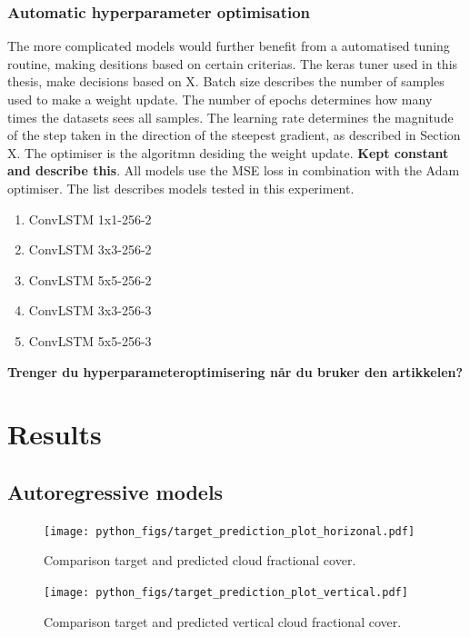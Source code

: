 \subsubsection{Automatic hyperparameter optimisation}  \label{sec:hyperparam_tuning}
The more complicated models would further benefit from a automatised tuning routine, making desitions based on certain criterias.
The keras tuner used in this thesis, make decisions based on X. Batch size describes the number of samples used to make a weight update. The number of epochs determines how many times the datasets sees all samples. The learning rate determines the magnitude of the step taken in the direction of the steepest gradient, as described in Section X. The optimiser is the algoritmn desiding the weight update. \textbf{Kept constant and describe this}. All models use the MSE loss in combination with the Adam optimiser. The list describes models tested in this experiment. 

\begin{enumerate}[noitemsep, topsep=0pt]
    \item ConvLSTM 1x1-256-2
    \item ConvLSTM 3x3-256-2
    \item ConvLSTM 5x5-256-2
    \item ConvLSTM 3x3-256-3
    \item ConvLSTM 5x5-256-3
\end{enumerate}

\textbf{Trenger du hyperparameteroptimisering når du bruker den artikkelen?}

\section{Results}

\subsection{Autoregressive models}

\begin{figure}[ht]
    \centering
    \texttt{[image: python\_figs/target\_prediction\_plot\_horizonal.pdf]}
    \caption{Comparison target and predicted cloud fractional cover.}
    \label{fig:target_predict_horizontal}
\end{figure}

\begin{figure}[ht]
    \centering
    \texttt{[image: python\_figs/target\_prediction\_plot\_vertical.pdf]}
    \caption{Comparison target and predicted vertical cloud fractional cover.}
    \label{fig:target_predict_vertical}
\end{figure}

